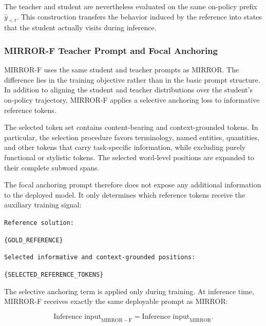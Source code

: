 \documentclass{article} %
\begin{document}
The teacher and student are nevertheless evaluated on the same on-policy prefix $\hat{y}_{<t}$. This construction transfers the behavior induced by the reference into states that the student actually visits during inference.

\subsubsection{MIRROR-F Teacher Prompt and Focal Anchoring}

MIRROR-F uses the same student and teacher prompts as MIRROR. The difference lies in the training objective rather than in the basic prompt structure. In addition to aligning the student and teacher distributions over the student's on-policy trajectory, MIRROR-F applies a selective anchoring loss to informative reference tokens.

The selected token set contains content-bearing and context-grounded tokens. In particular, the selection procedure favors terminology, named entities, quantities, and other tokens that carry task-specific information, while excluding purely functional or stylistic tokens. The selected word-level positions are expanded to their complete subword spans.

The focal anchoring prompt therefore does not expose any additional information to the deployed model. It only determines which reference tokens receive the auxiliary training signal:

\begin{tcolorbox}[
    colback=gray!5,
    colframe=black!45,
    title=MIRROR-F selective anchoring template,
    breakable,
    left=3pt,
    right=3pt,
    top=3pt,
    bottom=3pt
]
\small
\texttt{Reference solution:}

\texttt{\{GOLD\_REFERENCE\}}

\medskip

\texttt{Selected informative and context-grounded positions:}

\texttt{\{SELECTED\_REFERENCE\_TOKENS\}}
\end{tcolorbox}

The selective anchoring term is applied only during training. At inference time, MIRROR-F receives exactly the same deployable prompt as MIRROR:

\begin{equation}
\text{Inference input}_{\mathrm{MIRROR-F}}
=
\text{Inference input}_{\mathrm{MIRROR}}.
\end{equation}
\end{document}

